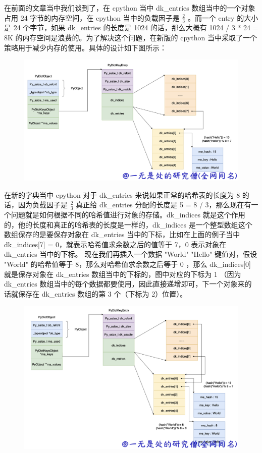 在前面的文章当中我们谈到了，在 cpython 当中 dk\_entries 数组当中的一个对象占用 24 字节的内存空间，在 cpython 当中的负载因子是 $\frac{2}{3}$ 。而一个 entry 的大小是 24 个字节，如果 dk\_entries 的长度是 1024 的话，那么大概有 1024  / 3 * 24 = 8K 的内存空间是浪费的。为了解决这个问题，在新版的 cpython 当中采取了一个策略用于减少内存的使用。具体的设计如下图所示：

    \begin{figure}[H]
        \centering
            \includegraphics[scale=.2]{images/33-dict.png}
						\caption{ }
        \label{fig:my_label}
    \end{figure}
    
在新的字典当中 cpython 对于 dk\_entries 来说如果正常的哈希表的长度为 8 的话，因为负载因子是 $\frac{2}{3}$ 真正给 dk\_entries 分配的长度是 5 = 8 / 3，那么现在有一个问题就是如何根据不同的哈希值进行对象的存储。dk\_indices 就是这个作用的，他的长度和真正的哈希表的长度是一样的，dk\_indices 是一个整型数组这个数组保存的是要保存对象在 dk\_entries 当中的下标，比如在上面的例子当中 dk\_indices[7] = 0，就表示哈希值求余数之后的值等于 7，0 表示对象在 dk\_entries 当中的下标。
现在我们再插入一个数据 "World" "Hello" 键值对，假设 "World" 的哈希值等于 8，那么对哈希值求余数之后等于 0 ，那么 dk\_indices[0] 就是保存对象在 dk\_entries 数组当中的下标的，图中对应的下标为 1 （因为 dk\_entries 数组当中的每个数据都要使用，因此直接递增即可，下一个对象来的话就保存在 dk\_entries 数组的第 3 个（下标为 2）位置）。

    \begin{figure}[H]
        \centering
            \includegraphics[scale=.2]{images/34-dict.png}
						\caption{ }
        \label{fig:my_label}
    \end{figure}
    
